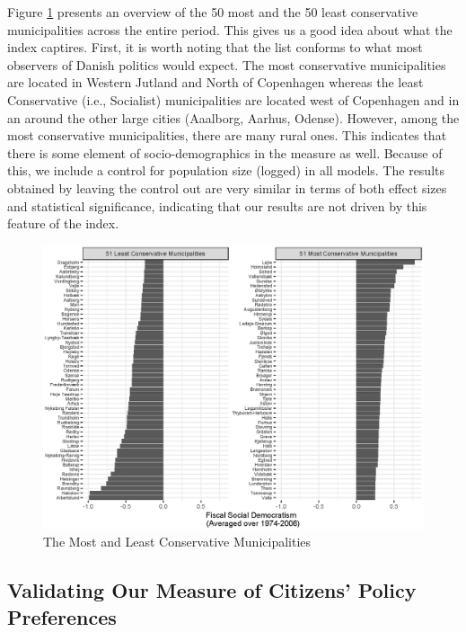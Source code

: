 \documentclass[a4paper,12pt]{article}
\begin{document}
Figure \ref{mostleast} presents an overview of the 50 most and the 50 least conservative municipalities across the entire period. This gives us a good idea about what the index captires. First, it is worth noting that the list conforms to what most observers of Danish politics would expect. The most conservative municipalities are located in Western Jutland and North of Copenhagen whereas the least Conservative (i.e., Socialist) municipalities are located west of Copenhagen and in an around the other large cities (Aaalborg, Aarhus, Odense). However, among the most conservative municipalities, there are many rural ones. This indicates that there is some element of socio-demographics in the measure as well. Because of this, we include a control for population size (logged) in all models. The results obtained by leaving the control out are very similar in terms of both effect sizes and statistical significance, indicating that our results are not driven by this feature of the index.

\begin{figure}[htbp]
	\centering
	\includegraphics[width=1\textwidth]{conservatism_24092018.eps}
	\caption{The Most and Least Conservative Municipalities} \label{mostleast}
\end{figure}

\clearpage


\subsection{Validating Our Measure of Citizens' Policy Preferences} \label{validation}
\end{document}
